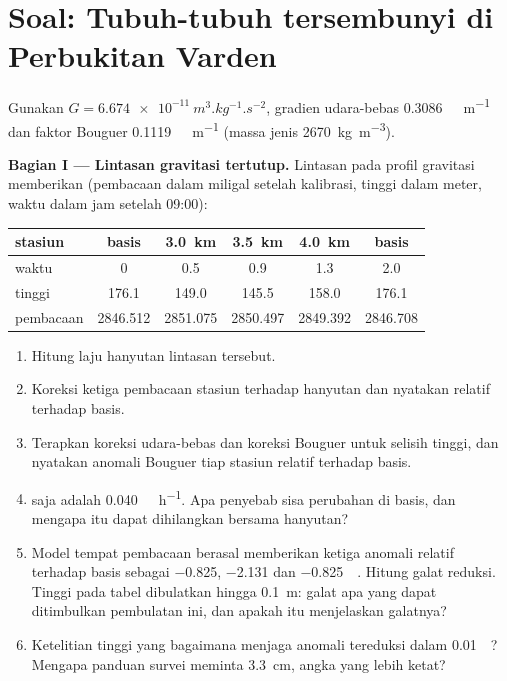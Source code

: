 \section{Soal: Tubuh-tubuh tersembunyi di Perbukitan Varden}

\begin{problem}
\label{pb:b3:field-lab-methods-3:1}
Gunakan $G = \qty{6.674e-11}{m^3.kg^{-1}.s^{-2}}$, gradien udara-bebas
\qty{0.3086}{\milli\gal.m^{-1}} dan faktor Bouguer
\qty{0.1119}{\milli\gal.m^{-1}} (massa jenis \qty{2670}{kg.m^{-3}}).

\medskip\noindent\textbf{Bagian I --- Lintasan gravitasi tertutup.} Lintasan pada
profil gravitasi memberikan (pembacaan dalam miligal setelah kalibrasi, tinggi
dalam meter, waktu dalam jam setelah 09:00):
\begin{center}
\small
\begin{tabular}{lccccc}
\hline
stasiun & basis & \qty{3.0}{km} & \qty{3.5}{km} & \qty{4.0}{km} & basis \\
\hline
waktu & 0 & 0.5 & 0.9 & 1.3 & 2.0 \\
tinggi & 176.1 & 149.0 & 145.5 & 158.0 & 176.1 \\
pembacaan & 2846.512 & 2851.075 & 2850.497 & 2849.392 & 2846.708 \\
\hline
\end{tabular}
\end{center}
\begin{enumerate}
\item Hitung laju hanyutan lintasan tersebut.
\item Koreksi ketiga pembacaan stasiun terhadap hanyutan dan nyatakan
  relatif terhadap basis.
\item Terapkan koreksi udara-bebas dan koreksi Bouguer untuk selisih
  tinggi, dan nyatakan anomali Bouguer tiap stasiun relatif terhadap
  basis.
\item {} saja adalah \qty{0.040}{\milli\gal.h^{-1}}.
  Apa penyebab sisa perubahan di basis, dan mengapa itu dapat
  dihilangkan bersama hanyutan?
\item Model tempat pembacaan berasal memberikan ketiga anomali
  relatif terhadap basis sebagai \num{-0.825}, \num{-2.131} dan
  \qty{-0.825}{\milli\gal}. Hitung galat reduksi. Tinggi
  pada tabel dibulatkan hingga \qty{0.1}{m}: galat apa yang dapat ditimbulkan
  pembulatan ini, dan apakah itu menjelaskan galatnya?
\item Ketelitian tinggi yang bagaimana menjaga anomali tereduksi dalam
  \qty{0.01}{\milli\gal}? Mengapa panduan survei meminta
  \qty{3.3}{cm}, angka yang lebih ketat?
\end{enumerate}


\end{problem}

